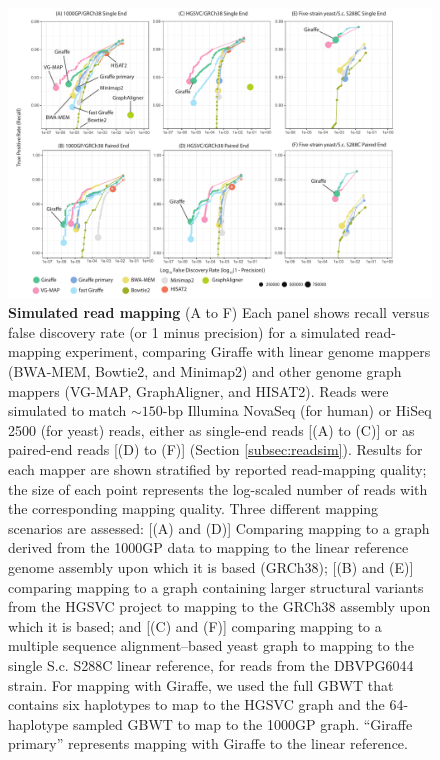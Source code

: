 \documentclass[11pt]{ucscthesis}
\begin{document}
\begin{figure}
    \centering
    \includegraphics[width=\linewidth]{aim2_fig2.pdf}
    \caption[Simulated read mapping]{\textbf{Simulated read mapping} (A to F) Each panel shows recall versus false discovery rate (or 1 minus precision) for a simulated read-mapping experiment, comparing Giraffe with linear genome mappers (BWA-MEM, Bowtie2, and Minimap2) and other genome graph mappers (VG-MAP, GraphAligner, and HISAT2). Reads were simulated to match $\sim150$-bp Illumina NovaSeq (for human) or HiSeq 2500 (for yeast) reads, either as single-end reads [(A) to (C)] or as paired-end reads [(D) to (F)] (Section \ref{subsec:readsim}). Results for each mapper are shown stratified by reported read-mapping quality; the size of each point represents the log-scaled number of reads with the corresponding mapping quality. Three different mapping scenarios are assessed: [(A) and (D)] Comparing mapping to a graph derived from the 1000GP data to mapping to the linear reference genome assembly upon which it is based (GRCh38); [(B) and (E)] comparing mapping to a graph containing larger structural variants from the HGSVC project to mapping to the GRCh38 assembly upon which it is based; and [(C) and (F)] comparing mapping to a multiple sequence alignment–based yeast graph to mapping to the single S.c. S288C linear reference, for reads from the DBVPG6044 strain. For mapping with Giraffe, we used the full GBWT that contains six haplotypes to map to the HGSVC graph and the 64-haplotype sampled GBWT to map to the 1000GP graph. “Giraffe primary” represents mapping with Giraffe to the linear reference.}
    \label{fig:aim2_fig2}
\end{figure}
\end{document}

